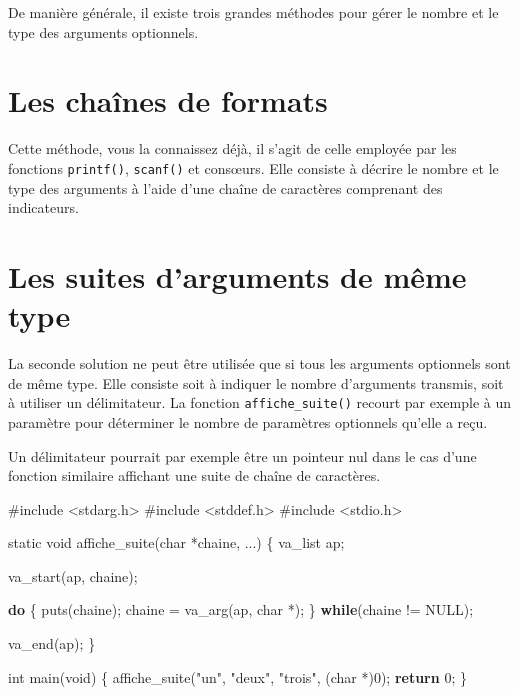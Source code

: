 \documentclass[]{article}
\date{}
\newenvironment{Shaded}{}{}
\newcommand{\DataTypeTok}[1]{\textcolor[rgb]{0.56,0.13,0.00}{{#1}}}
\newcommand{\DecValTok}[1]{\textcolor[rgb]{0.25,0.63,0.44}{{#1}}}
\newcommand{\StringTok}[1]{\textcolor[rgb]{0.25,0.44,0.63}{{#1}}}
\newcommand{\ImportTok}[1]{{#1}}
\newcommand{\ControlFlowTok}[1]{\textcolor[rgb]{0.00,0.44,0.13}{\textbf{{#1}}}}
\newcommand{\PreprocessorTok}[1]{\textcolor[rgb]{0.74,0.48,0.00}{{#1}}}
\newcommand{\NormalTok}[1]{{#1}}
\begin{document}
{
\setcounter{tocdepth}{3}
\tableofcontents
}
De manière générale, il existe trois grandes méthodes pour gérer le
nombre et le type des arguments optionnels.

\section{Les chaînes de formats}\label{les-chauxeenes-de-formats}

Cette méthode, vous la connaissez déjà, il s'agit de celle employée par
les fonctions \texttt{printf()}, \texttt{scanf()} et consœurs. Elle
consiste à décrire le nombre et le type des arguments à l'aide d'une
chaîne de caractères comprenant des indicateurs.

\section{Les suites d'arguments de même
type}\label{les-suites-darguments-de-muxeame-type}

La seconde solution ne peut être utilisée que si tous les arguments
optionnels sont de même type. Elle consiste soit à indiquer le nombre
d'arguments transmis, soit à utiliser un délimitateur. La fonction
\texttt{affiche\_suite()} recourt par exemple à un paramètre pour
déterminer le nombre de paramètres optionnels qu'elle a reçu.

Un délimitateur pourrait par exemple être un pointeur nul dans le cas
d'une fonction similaire affichant une suite de chaîne de caractères.

\begin{Shaded}
\begin{Highlighting}[]
\PreprocessorTok{#include }\ImportTok{<stdarg.h>}
\PreprocessorTok{#include }\ImportTok{<stddef.h>}
\PreprocessorTok{#include }\ImportTok{<stdio.h>}


\DataTypeTok{static} \DataTypeTok{void} \NormalTok{affiche_suite(}\DataTypeTok{char} \NormalTok{*chaine, ...)}
\NormalTok{\{}
    \NormalTok{va_list ap;}

    \NormalTok{va_start(ap, chaine);}

    \ControlFlowTok{do}
    \NormalTok{\{}
        \NormalTok{puts(chaine);}
        \NormalTok{chaine = va_arg(ap, }\DataTypeTok{char} \NormalTok{*);}
    \NormalTok{\} }\ControlFlowTok{while}\NormalTok{(chaine != NULL);}

    \NormalTok{va_end(ap);}
\NormalTok{\}}


\DataTypeTok{int} \NormalTok{main(}\DataTypeTok{void}\NormalTok{)}
\NormalTok{\{}
    \NormalTok{affiche_suite(}\StringTok{"un"}\NormalTok{, }\StringTok{"deux"}\NormalTok{, }\StringTok{"trois"}\NormalTok{, (}\DataTypeTok{char} \NormalTok{*)}\DecValTok{0}\NormalTok{);}
    \ControlFlowTok{return} \DecValTok{0}\NormalTok{;}
\NormalTok{\}}
\end{Highlighting}
\end{Shaded}
\end{document}
